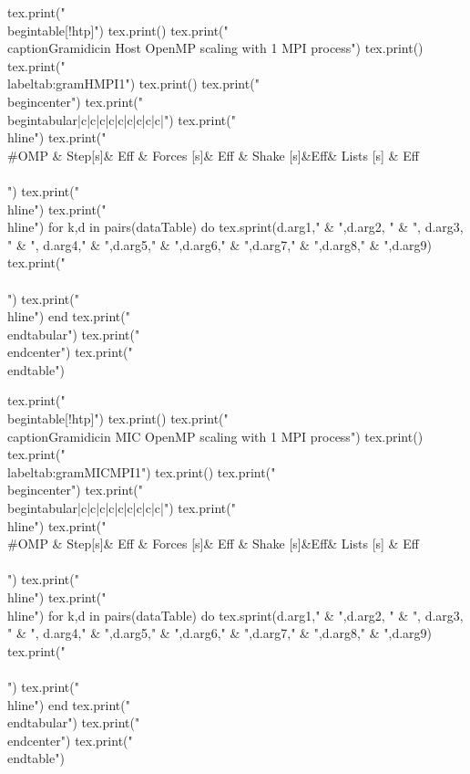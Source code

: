 \begin{luacode*}
  tex.print("\\begin{table}[!htp]")
  tex.print()
  tex.print("\\caption{Gramidicin Host OpenMP scaling with 1 MPI process}")
  tex.print()
  tex.print("\\label{tab:gramHMPI1}")
  tex.print()
  tex.print("\\begin{center}")
  tex.print("\\begin{tabular}{|c|c|c|c|c|c|c|c|c|}")
  tex.print("\\hline")
  tex.print("\\#OMP & Step[s]& Eff & Forces [s]& Eff & Shake [s]&Eff& Lists [s] & Eff\\\\")
  tex.print("\\hline")
  tex.print("\\hline")
  for k,d in pairs(dataTable) do
    tex.sprint(d.arg1," & ",d.arg2, " & ", d.arg3, " & ", d.arg4," & ",d.arg5," & ",d.arg6," & ",d.arg7," & ",d.arg8," & ",d.arg9)
    tex.print(" \\\\")
    tex.print("\\hline")
  end
  tex.print("\\end{tabular}")
  tex.print("\\end{center}")
  tex.print("\\end{table}")
\end{luacode*}
\begin{luacode*}
  tex.print("\\begin{table}[!htp]")
  tex.print()
  tex.print("\\caption{Gramidicin MIC OpenMP scaling with 1 MPI process}")
  tex.print()
  tex.print("\\label{tab:gramMICMPI1}")
  tex.print()
  tex.print("\\begin{center}")
  tex.print("\\begin{tabular}{|c|c|c|c|c|c|c|c|c|}")
  tex.print("\\hline")
  tex.print("\\#OMP & Step[s]& Eff & Forces [s]& Eff & Shake [s]&Eff& Lists [s] & Eff\\\\")
  tex.print("\\hline")
  tex.print("\\hline")
  for k,d in pairs(dataTable) do
    tex.sprint(d.arg1," & ",d.arg2, " & ", d.arg3, " & ", d.arg4," & ",d.arg5," & ",d.arg6," & ",d.arg7," & ",d.arg8," & ",d.arg9)
    tex.print(" \\\\")
    tex.print("\\hline")
  end
  tex.print("\\end{tabular}")
  tex.print("\\end{center}")
  tex.print("\\end{table}")
\end{luacode*}

